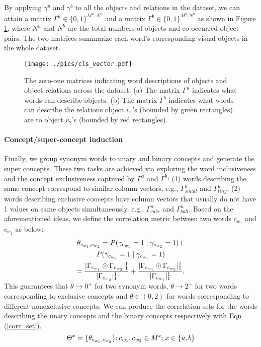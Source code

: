 \documentclass[10pt,twocolumn,letterpaper]{article}
\begin{document}
By applying $\gamma^u$ and $\gamma^b$ to all the objects and relations in the dataset, we can attain a matrix $\Gamma^u \in \{0,1\}^{M^u,N^u}$ and a matrix $\Gamma^b \in \{0,1\}^{M^b,N^b}$ as shown in Figure \ref{cls_vector}, where $N^u$ and $N^b$ are the total numbers of objects and co-occurred object pairs. The two matrices summarize each word's corresponding visual objects in the whole dataset.

\begin{figure}
\centering
\texttt{[image: ./pics/cls\_vector.pdf]}
\caption{\small{The zero-one matrices indicating word descriptions of objects and object relations across the dataset. (a) The matrix $\Gamma^u$ indicates what words can describe objects. (b) The matrix $\Gamma^b$ indicates what words can describe the relations object $v_1$'s (bounded by green rectangles) are to object $v_2$'s (bounded by red rectangles).}}
\label{cls_vector}
\vspace{-8mm}
\end{figure}

\vspace{-6mm}
\paragraph{Concept/super-concept induction}
Finally, we group synonym words to unary and binary concepts and generate the super concepts. 
These two tasks are achieved via exploring the word inclusiveness and the concept exclusiveness captured by $\Gamma^u$ and $\Gamma^b$:
(1) words describing the same concept correspond to similar column vectors, e.g., $\Gamma^u_{small}$ and $\Gamma^u_{tiny}$;
(2) words describing exclusive concepts have column vectors that usually do not have 1 values on same objects simultaneously, e.g., $\Gamma^u_{cube}$ and $\Gamma^u_{ball}$. 
Based on the aforementioned ideas, we define the correlation metric between two words $c_{w_1}$ and $c_{w_2}$ as below:
\vspace{-4mm}
\begin{multline}
\small
    \theta_{c_{w_1}, c_{w_2}} = P(\gamma_{c_{w_1}}=1 \mid \gamma_{c_{w_2}}=1) + \\
    P(\gamma_{c_{w_2}}=1 \mid \gamma_{c_{w_1}}=1) \\
    = \frac{|\Gamma_{c_{w_1}} \odot \Gamma_{c_{w_2}}|_1^1}{|\Gamma_{c_{w_2}}|_1^1}+\frac{|\Gamma_{c_{w_1}} \odot \Gamma_{c_{w_2}}|_1^1}{|\Gamma_{c_{w_1}}|_1^1}.
    \label{corr}
\vspace{-2mm}
\end{multline}
This guarantees that $\theta \rightarrow 0^+$ for two synonym words, $\theta \rightarrow 2^-$ for two words corresponding to exclusive concepts and $\theta \in (0,2)$ for words corresponding to different nonexclusive concepts. We can produce the correlation sets for the words describing the unary concepts and the binary concepts respectively with Eqn (\ref{corr_set}).
\begin{equation}
\vspace{-2mm}
\small
    \Theta^x = \{\theta_{c_{w_1}, c_{w_2}}\}; c_{w_1}, c_{w_2} \in M^x; x \in\{u,b\} \\
    \label{corr_set}
\end{equation}
\end{document}
